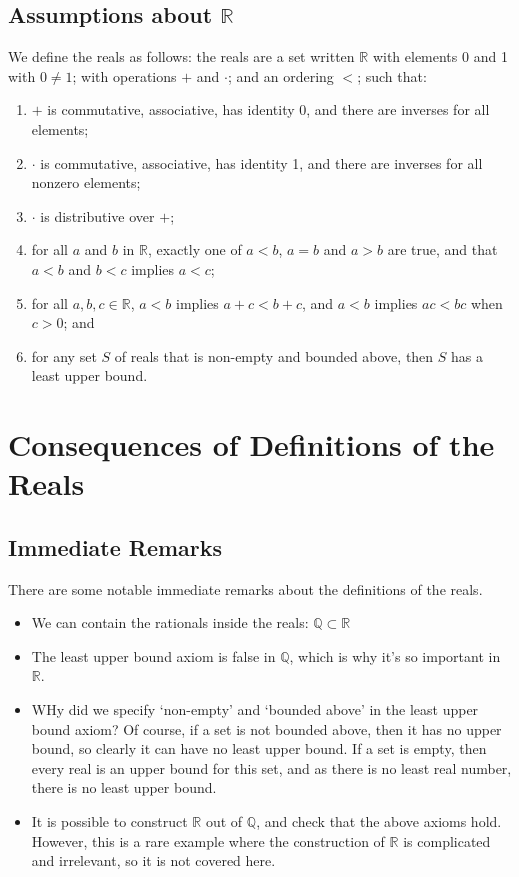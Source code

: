 \documentclass{article}
\begin{document}
	\subsection{Assumptions about $\mathbb R$}
	We define the reals as follows: the reals are a set written $\mathbb R$ with elements 0 and 1 with $0 \neq 1$; with operations $+$ and $\cdot$; and an ordering $<$; such that:
	\begin{enumerate}
		\item $+$ is commutative, associative, has identity 0, and there are inverses for all elements;
		\item $\cdot$ is commutative, associative, has identity 1, and there are inverses for all nonzero elements;
		\item $\cdot$ is distributive over $+$;
		\item for all $a$ and $b$ in $\mathbb R$, exactly one of $a<b$, $a=b$ and $a>b$ are true, and that $a<b$ and $b<c$ implies $a<c$;
		\item for all $a, b, c \in \mathbb R$, $a<b$ implies $a + c < b + c$, and $a<b$ implies $ac < bc$ when $c > 0$; and
		\item for any set $S$ of reals that is non-empty and bounded above, then $S$ has a least upper bound.
	\end{enumerate}

	\section{Consequences of Definitions of the Reals}
	\subsection{Immediate Remarks}
	There are some notable immediate remarks about the definitions of the reals.
	\begin{itemize}
		\item We can contain the rationals inside the reals: $\mathbb Q \subset \mathbb R$
		\item The least upper bound axiom is false in $\mathbb Q$, which is why it's so important in $\mathbb R$.
		\item WHy did we specify `non-empty' and `bounded above' in the least upper bound axiom? Of course, if a set is not bounded above, then it has no upper bound, so clearly it can have no least upper bound. If a set is empty, then every real is an upper bound for this set, and as there is no least real number, there is no least upper bound.
		\item It is possible to construct $\mathbb R$ out of $\mathbb Q$, and check that the above axioms hold. However, this is a rare example where the construction of $\mathbb R$ is complicated and irrelevant, so it is not covered here.
	\end{itemize}
\end{document}
